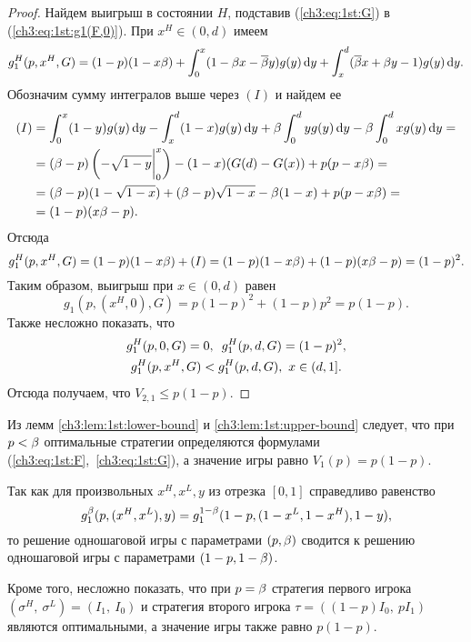 {\begin{proof}
  Найдем выигрыш в состоянии $H$, подставив (\ref{ch3:eq:1st:G}) в (\ref{ch3:eq:1st:g1(F,0)}).
  При $x^H \in (0, d)$ имеем
  \begin{multline*}
    g^H_1(p, x^H, G) = (1 - p)(1 - x\beta) + \int_0^x (1 - \beta x - {{\overline{\beta}}} y) g(y) \mathop{}\!\mathrm{d} y + \int_x^d ({{\overline{\beta}}} x + \beta y - 1) g(y) \mathop{}\!\mathrm{d} y. 
  \end{multline*}
  Обозначим сумму интегралов выше через $(I)$ и найдем ее
  \begin{align*}
    (I)
    &= \int_0^x (1-y) g(y) \mathop{}\!\mathrm{d} y - \int_x^d (1-x) g(y) \mathop{}\!\mathrm{d} y + \beta \int_0^d y g(y) \mathop{}\!\mathrm{d} y - \beta \int_0^d x g(y) \mathop{}\!\mathrm{d} y = \\
    &= (\beta - p)\left(-\sqrt{1-y}\bigg|_0^x\right) - (1 - x)(G(d) - G(x)) + p(p - x\beta) = \\
    &= (\beta - p)(1 - \sqrt{1-x}) + (\beta - p)\sqrt{1-x} - \beta (1 - x) + p(p - x\beta) = \\
    &= (1 - p)(x\beta - p).
  \end{align*}
  Отсюда
  \begin{equation*}
    g^H_1(p, x^H, G) = (1 - p)(1 - x\beta) + (I) = (1 - p)(1 - x\beta) + (1 - p)(x\beta - p) = (1 - p)^2.
  \end{equation*}
  Таким образом, выигрыш при $x \in (0, d)$ равен
  \begin{equation*}
    g_1(p, (x^H, 0), G) = p (1 - p)^2 + (1 - p) p^2 = p (1 - p).
  \end{equation*}
  Также несложно показать, что 
  \begin{gather*}
    g^H_1(p, 0, G) = 0,\enskip
    g^H_1(p, d, G) = (1 - p)^2, \\
    g^H_1(p, x^H, G) < g^H_1(p, d, G),\ x \in (d, 1].
  \end{gather*}
  Отсюда получаем, что $V_{2,1} \leq p(1-p)$.
\end{proof}

Из лемм \ref{ch3:lem:1st:lower-bound} и \ref{ch3:lem:1st:upper-bound} следует, что при $p < \beta$ оптимальные стратегии определяются формулами (\ref{ch3:eq:1st:F},~\ref{ch3:eq:1st:G}), а значение игры равно $V_1(p) = p(1-p)$.

Так как для произвольных $x^H, x^L, y$ из отрезка $[0, 1]$ справедливо равенство
\[
  g^{\beta}_1(p, (x^H, x^L), y) = g^{1-\beta}_1(1 - p, (1 - x^L, 1 - x^H), 1 - y),
\]
то решение одношаговой игры с параметрами $(p, \beta)$ сводится к решению одношаговой игры с параметрами $(1 - p, 1 - \beta)$.

Кроме того, несложно показать, что при $p = \beta$ стратегия первого игрока $(\sigma^H,\ \sigma^L) = (I_1,\ I_0)$ и стратегия второго игрока $\tau = \left( (1-p) I_0,\ p I_1 \right)$ являются оптимальными, а значение игры также равно $p(1-p)$.

}
